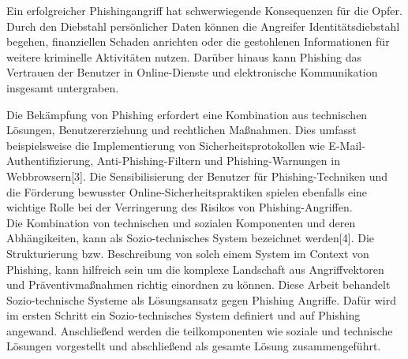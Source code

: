\documentclass[journal=tosc,final]{iacrtrans}
\begin{document}
Ein erfolgreicher Phishingangriff hat schwerwiegende Konsequenzen für die Opfer. Durch den Diebstahl persönlicher Daten können die Angreifer Identitätsdiebstahl begehen, finanziellen Schaden anrichten oder die gestohlenen Informationen für weitere kriminelle Aktivitäten nutzen. Darüber hinaus kann Phishing das Vertrauen der Benutzer in Online-Dienste und elektronische Kommunikation insgesamt untergraben.

Die Bekämpfung von Phishing erfordert eine Kombination aus technischen Lösungen, Benutzererziehung und rechtlichen Maßnahmen. Dies umfasst beispielsweise die Implementierung von Sicherheitsprotokollen wie E-Mail-Authentifizierung, Anti-Phishing-Filtern und Phishing-Warnungen in Webbrowsern[3]. Die Sensibilisierung der Benutzer für Phishing-Techniken und die Förderung bewusster Online-Sicherheitspraktiken spielen ebenfalls eine wichtige Rolle bei der Verringerung des Risikos von Phishing-Angriffen.\\ Die Kombination von technischen und sozialen Komponenten und deren Abhängikeiten, kann als Sozio-technisches System bezeichnet werden[4]. Die Strukturierung bzw. Beschreibung von solch einem System im Context von Phishing, kann hilfreich sein um die komplexe Landschaft aus Angriffvektoren und Präventivmaßnahmen richtig einordnen zu können. Diese Arbeit behandelt Sozio-technische Systeme  als Lösungsansatz gegen Phishing Angriffe. Dafür wird im ersten Schritt ein Sozio-technisches System definiert und auf Phishing angewand. Anschließend werden die teilkomponenten wie soziale und technische Lösungen vorgestellt und abschließend als gesamte Lösung zusammengeführt. 


\newpage
\end{document}
